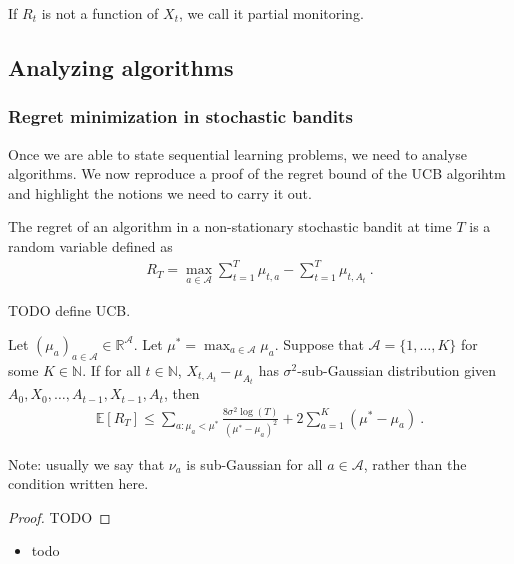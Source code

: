 If $R_t$ is not a function of $X_t$, we call it partial monitoring.

\subsection{Analyzing algorithms}
\label{sub:analyzing_algorithms}

\subsubsection{Regret minimization in stochastic bandits}
\label{subs:regret_minimization_in_stochastic_bandits}

Once we are able to state sequential learning problems, we need to analyse algorithms. We now reproduce a proof of the regret bound of the UCB algorihtm and highlight the notions we need to carry it out.

\begin{definition}
The regret of an algorithm in a non-stationary stochastic bandit at time $T$ is a random variable defined as
\begin{align*}
R_T = \max_{a \in \mathcal A} \sum_{t=1}^T \mu_{t, a} - \sum_{t=1}^T \mu_{t, A_t} \: .
\end{align*}
\end{definition}

TODO define UCB.

\begin{theorem}
Let $(\mu_a)_{a \in \mathcal A} \in \mathbb{R}^{\mathcal A}$. Let $\mu^* = \max_{a \in \mathcal A} \mu_a$. Suppose that $\mathcal A = \{1, \ldots, K\}$ for some $K \in \mathbb{N}$. If for all $t \in \mathbb{N}$, $X_{t,A_t} - \mu_{A_t}$ has $\sigma^2$-sub-Gaussian distribution given $A_0, X_0, \ldots, A_{t-1}, X_{t-1}, A_t$, then
\begin{align*}
\mathbb{E}[R_T] \le \sum_{a: \mu_a < \mu^*} \frac{8 \sigma^2 \log(T)}{(\mu^* - \mu_a)^2} + 2\sum_{a = 1}^K (\mu^* - \mu_a) \: .
\end{align*}
\end{theorem}
Note: usually we say that $\nu_a$ is sub-Gaussian for all $a \in \mathcal A$, rather than the condition written here.

\begin{proof}
TODO
\end{proof}

\begin{remark}
\begin{itemize}
    \item todo
\end{itemize}
\end{remark}

